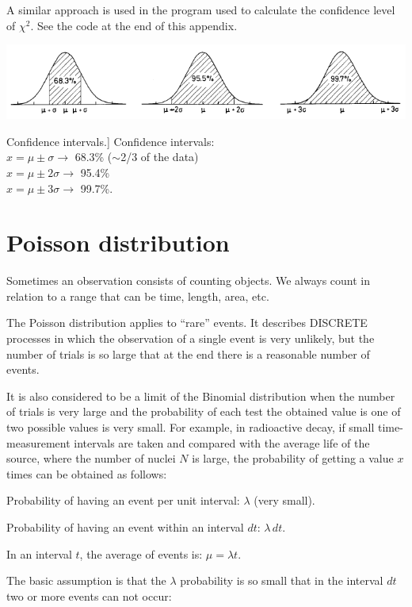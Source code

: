 A similar approach is used in the program used to calculate the confidence level of $\chi^2$. See the code at the end of this appendix.

	\bfi[H]
		\bc
			\includegraphics[width=.9\textwidth]{img/app41.png}
			\caption
				[Confidence intervals.]
				{Confidence intervals:\\
					$x = \mu \pm  \sigma \rightarrow$ 68.3\% ($\sim$2/3 of the data)\\
					$x = \mu \pm 2\sigma \rightarrow$ 95.4\%\\
					$x = \mu \pm 3\sigma \rightarrow$ 99.7\%.}\label{fig:confidence}
		\ec
	\efi


	

\section{Poisson distribution}\label{sec:poisson}

Sometimes an observation consists of counting objects. We always count in relation to a range that can be time, length, area, etc.

The Poisson distribution applies to \enquote{rare} events. It describes DISCRETE  processes in which the observation of a single event is very unlikely, but the number of trials is so large that at the end there is a reasonable number of events.

It is also considered to be a limit of the Binomial distribution when the number of trials is very large and the probability of each test the obtained value is one of two possible values is very small. For example, in radioactive decay, if small time-measurement intervals are taken and compared with the average life of the source, where the number of nuclei $N$ is large, the probability of getting a value $x$ times can be obtained as follows:

\bi
	\item Probability of having an event per unit interval: $\lambda$ (very small).
	\item Probability of having an event within an interval $dt$: $\lambda \,dt$.
	\item In an interval $t$, the average of events is: $\mu = \lambda t$.
\ei

The basic assumption is that the $\lambda$ probability is so small that in the interval $dt$ two or more events can not occur:

